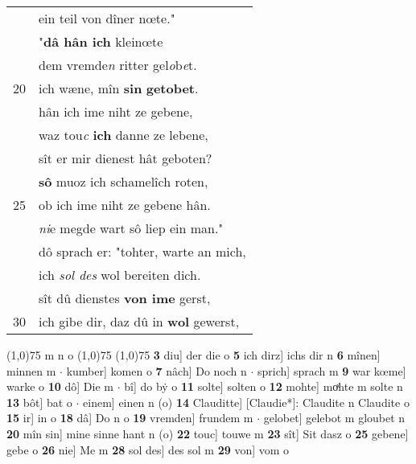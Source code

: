\documentclass[8pt,a4paper,notitlepage]{article}
\begin{document}
\begin{table}[ht]
\begin{minipage}[t]{0.5\linewidth}
\begin{tabular}{rl}
 & ein teil von dîner nœte."\\ 
 & "\textbf{dâ hân ich} kleinœte\\ 
 & dem vremde\textit{n} ritter gel\textit{o}b\textit{e}t.\\ 
20 & ich wæne, mîn \textbf{sin}  \textbf{getobet}.\\ 
 & hân ich ime niht ze gebene,\\ 
 & waz tou\textit{c} \textbf{ich} danne ze lebene,\\ 
 & sît er mir dienest hât geboten?\\ 
 & \textbf{sô} muoz ich schamelîch roten,\\ 
25 & ob ich ime niht ze gebene hân.\\ 
 & \textit{ni}e megde wart sô liep ein man."\\ 
 & dô sprach er: "tohter, warte an mich,\\ 
 & ich \textit{sol des} wol bereiten dich.\\ 
 & sît dû dienstes \textbf{von ime} gerst,\\ 
30 & ich gibe dir, daz dû in \textbf{wol} gewerst,\\ 
\end{tabular}
\scriptsize
\line(1,0){75} \newline
m n o \newline
\line(1,0){75} \newline
\newline
\line(1,0){75} \newline
\textbf{3} diu] der die o \textbf{5} ich dirz] ichs dir n \textbf{6} mînen] minnen m  $\cdot$ kumber] komen o \textbf{7} nâch] Do noch n  $\cdot$ sprich] sprach m \textbf{9} war kœme] warke o \textbf{10} dô] Die m  $\cdot$ bî] do bẏ o \textbf{11} solte] solten o \textbf{12} mohte] moͯhte m solte n \textbf{13} bôt] bat o  $\cdot$ einem] einen n (o) \textbf{14} Clauditte] [Claudie*]: Claudite n Claudite o \textbf{15} ir] in o \textbf{18} dâ] Do n o \textbf{19} vremden] frundem m  $\cdot$ gelobet] gelebot m gloubet n \textbf{20} mîn sin] mine sinne hant n (o) \textbf{22} touc] touwe m \textbf{23} sît] Sit dasz o \textbf{25} gebene] gebe o \textbf{26} nie] Me m \textbf{28} sol des] des sol m \textbf{29} von] vom o \newline
\end{minipage}
\end{table}
\newpage
\end{document}
